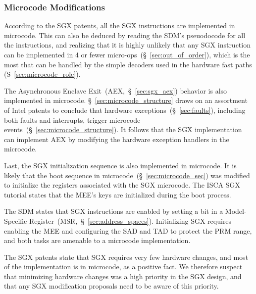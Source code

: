 \subsubsection{Microcode Modifications}

According to the SGX patents, all the SGX instructions are implemented in
microcode. This can also be deduced by reading the SDM's pseuodocode for all
the instructions, and realizing that it is highly unlikely that any SGX
instruction can be implemented in 4 or fewer
micro-ops~(\S~\ref{sec:out_of_order}), which is the most that can be
handled by the simple decoders used in the hardware fast paths
(S~\ref{sec:microcode_role}).

The Asynchronous Enclave Exit~(AEX,~\S~\ref{sec:sgx_aex}) behavior is also
implemented in microcode. \S~\ref{sec:microcode_structure} draws on an
assortment of Intel patents to conclude that hardware
exceptions~(\S~\ref{sec:faults}), including both faults and interrupts,
trigger microcode events~(\S~\ref{sec:microcode_structure}). It follows that
the SGX implementation can implement AEX by modifying the hardware exception
handlers in the microcode.


Last, the SGX initialization sequence is also implemented in microcode. It is
likely that the boot sequence in microcode~(\S~\ref{sec:microcode_sec}) was
modified to initialize the registers associated with the SGX microcode. The
ISCA SGX tutorial states that the MEE's keys are initialized during the boot
process.


The SDM states that SGX instructions are enabled by setting a bit in a
Model-Specific Register~(MSR,~\S~\ref{sec:address_spaces}). Initializing SGX
requires enabling the MEE and configuring the SAD and TAD to protect the PRM
range, and both tasks are amenable to a microcode implementation.

The SGX patents state that SGX requires very few hardware changes, and most of
the implementation is in microcode, as a positive fact. We therefore suspect
that minimizing hardware changes was a high priority in the SGX design, and
that any SGX modification proposals need to be aware of this priority.
